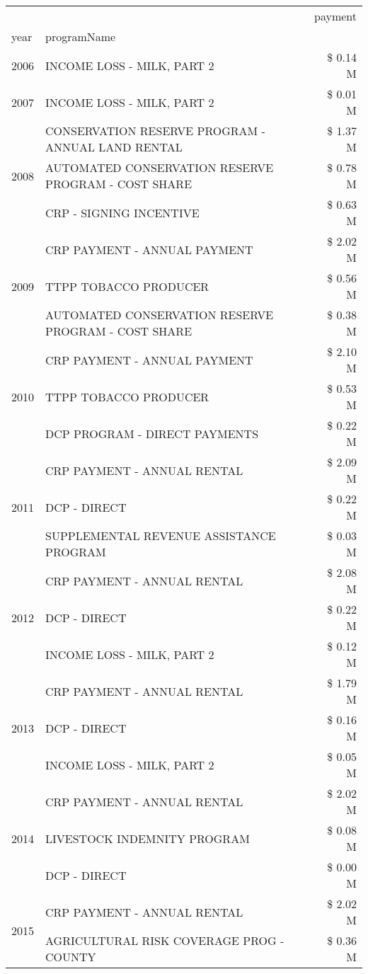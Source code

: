 \begin{tabular}{llr}
\toprule
 &  & payment \\
year & programName &  \\
\midrule
2006 & INCOME LOSS - MILK, PART 2 & \$ 0.14 M \\
\cline{1-3}
2007 & INCOME LOSS - MILK, PART 2 & \$ 0.01 M \\
\cline{1-3}
\multirow[t]{3}{*}{2008} & CONSERVATION RESERVE PROGRAM - ANNUAL LAND RENTAL & \$ 1.37 M \\
 & AUTOMATED CONSERVATION RESERVE PROGRAM - COST SHARE & \$ 0.78 M \\
 & CRP - SIGNING INCENTIVE & \$ 0.63 M \\
\cline{1-3}
\multirow[t]{3}{*}{2009} & CRP PAYMENT - ANNUAL PAYMENT & \$ 2.02 M \\
 & TTPP TOBACCO PRODUCER & \$ 0.56 M \\
 & AUTOMATED CONSERVATION RESERVE PROGRAM - COST SHARE & \$ 0.38 M \\
\cline{1-3}
\multirow[t]{3}{*}{2010} & CRP PAYMENT - ANNUAL PAYMENT & \$ 2.10 M \\
 & TTPP TOBACCO PRODUCER & \$ 0.53 M \\
 & DCP PROGRAM - DIRECT PAYMENTS & \$ 0.22 M \\
\cline{1-3}
\multirow[t]{3}{*}{2011} & CRP PAYMENT - ANNUAL RENTAL & \$ 2.09 M \\
 & DCP - DIRECT & \$ 0.22 M \\
 & SUPPLEMENTAL REVENUE ASSISTANCE PROGRAM & \$ 0.03 M \\
\cline{1-3}
\multirow[t]{3}{*}{2012} & CRP PAYMENT - ANNUAL RENTAL & \$ 2.08 M \\
 & DCP - DIRECT & \$ 0.22 M \\
 & INCOME LOSS - MILK, PART 2 & \$ 0.12 M \\
\cline{1-3}
\multirow[t]{3}{*}{2013} & CRP PAYMENT - ANNUAL RENTAL & \$ 1.79 M \\
 & DCP - DIRECT & \$ 0.16 M \\
 & INCOME LOSS - MILK, PART 2 & \$ 0.05 M \\
\cline{1-3}
\multirow[t]{3}{*}{2014} & CRP PAYMENT - ANNUAL RENTAL & \$ 2.02 M \\
 & LIVESTOCK INDEMNITY PROGRAM & \$ 0.08 M \\
 & DCP - DIRECT & \$ 0.00 M \\
\cline{1-3}
\multirow[t]{3}{*}{2015} & CRP PAYMENT - ANNUAL RENTAL & \$ 2.02 M \\
 & AGRICULTURAL RISK COVERAGE PROG - COUNTY & \$ 0.36 M \\

\end{tabular}
